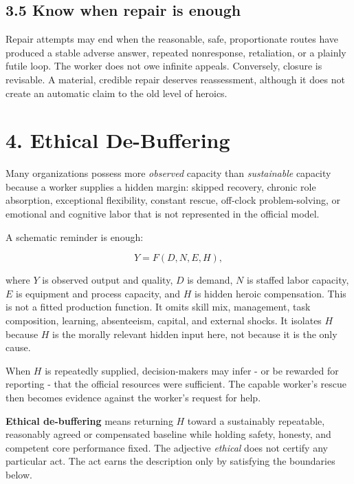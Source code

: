 \documentclass[11pt,oneside]{article}
\begin{document}
\hypertarget{know-when-repair-is-enough}{%
\subsection{3.5 Know when repair is
enough}\label{know-when-repair-is-enough}}

Repair attempts may end when the reasonable, safe, proportionate routes
have produced a stable adverse answer, repeated nonresponse,
retaliation, or a plainly futile loop. The worker does not owe infinite
appeals. Conversely, closure is revisable. A material, credible repair
deserves reassessment, although it does not create an automatic claim to
the old level of heroics.

\hypertarget{ethical-de-buffering}{%
\section{4. Ethical De-Buffering}\label{ethical-de-buffering}}

Many organizations possess more \emph{observed} capacity than
\emph{sustainable} capacity because a worker supplies a hidden margin:
skipped recovery, chronic role absorption, exceptional flexibility,
constant rescue, off-clock problem-solving, or emotional and cognitive
labor that is not represented in the official model.

A schematic reminder is enough:

\[
Y = F(D,N,E,H),
\]

where \(Y\) is observed output and quality, \(D\) is demand, \(N\) is
staffed labor capacity, \(E\) is equipment and process capacity, and
\(H\) is hidden heroic compensation. This is not a fitted production
function. It omits skill mix, management, task composition, learning,
absenteeism, capital, and external shocks. It isolates \(H\) because
\(H\) is the morally relevant hidden input here, not because it is the
only cause.

When \(H\) is repeatedly supplied, decision-makers may infer - or be
rewarded for reporting - that the official resources were sufficient.
The capable worker's rescue then becomes evidence against the worker's
request for help.

\textbf{Ethical de-buffering} means returning \(H\) toward a sustainably
repeatable, reasonably agreed or compensated baseline while holding
safety, honesty, and competent core performance fixed. The adjective
\emph{ethical} does not certify any particular act. The act earns the
description only by satisfying the boundaries below.
\end{document}
